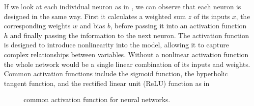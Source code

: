 If we look at each individual neuron as in , we can observe that each neuron is designed in the same way. First it calculates a weighted sum $z$ of its inputs $x$, the corresponding weights $w$ and bias $b$, before passing it into an activation function $h$ and finally passing the information to the next neuron. The activation function is designed to introduce nonlinearity into the model, allowing it to capture complex relationships between variables. Without a nonlinear activation function the whole network would be a single linear combination of its inputs and weights. Common activation functions include the sigmoid function, the hyperbolic tangent function, and the rectified linear unit (ReLU) function as in 
\begin{figure}
    \begin{center}
        \hfill
        \hfill
    \end{center}
    \caption[common activation functions in a neural network]{common activation function for neural networks.}
    \label{fig:activation_function}
\end{figure}
